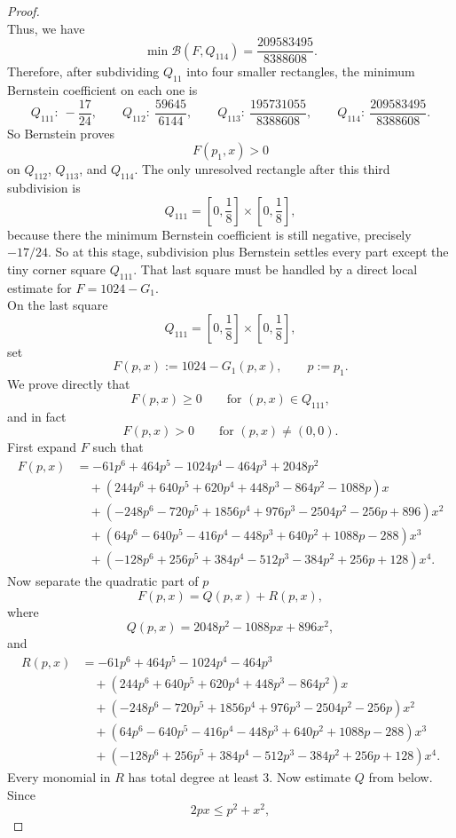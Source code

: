 \documentclass[a4paper,12pt,reqno]{amsart} %
\numberwithin{equation}{section}
\theoremstyle{definition}
\begin{document}
\begin{proof}
\[\]
Thus, we have
\[
\min \mathcal B(F,Q_{114})=\frac{209583495}{8388608}.
\]
Therefore, after subdividing \(Q_{11}\) into four smaller rectangles, the minimum Bernstein coefficient on each one is
\[
Q_{111}:\ -\frac{17}{24},\qquad
Q_{112}:\ \frac{59645}{6144},\qquad
Q_{113}:\ \frac{195731055}{8388608},\qquad
Q_{114}:\ \frac{209583495}{8388608}.
\]
So Bernstein proves
\[
F(p_1,x)>0
\]
on \(Q_{112}\), \(Q_{113}\), and \(Q_{114}\).
The only unresolved rectangle after this third subdivision is
\[
Q_{111}=\left[0,\frac18\right]\times\left[0,\frac18\right],
\]
because there the minimum Bernstein coefficient is still negative, precisely
$
-{17}/{24}.
$
So at this stage, subdivision plus Bernstein settles every part except the tiny corner square \(Q_{111}\). That last square must be handled by a direct local estimate for \(F=1024-G_1\).\\[2mm]
On the last square
\[
Q_{111}=\left[0,\frac18\right]\times\left[0,\frac18\right],
\]
set
\[
F(p,x):=1024-G_1(p,x), \qquad p:=p_1.
\]
We prove directly that
\[
F(p,x)\ge 0 \qquad \text{for } (p,x)\in Q_{111},
\]
and in fact
\[
F(p,x)>0 \qquad \text{for } (p,x)\neq(0,0).
\]
First expand $F$ such that 
\[
\begin{aligned}
	F(p,x)
	&=-61p^6+464p^5-1024p^4-464p^3+2048p^2 \\
	&\quad+\left(244p^6+640p^5+620p^4+448p^3-864p^2-1088p\right)x \\
	&\quad+\left(-248p^6-720p^5+1856p^4+976p^3-2504p^2-256p+896\right)x^2 \\
	&\quad+\left(64p^6-640p^5-416p^4-448p^3+640p^2+1088p-288\right)x^3 \\
	&\quad+\left(-128p^6+256p^5+384p^4-512p^3-384p^2+256p+128\right)x^4.
\end{aligned}
\]
Now separate the quadratic part of $p$
\[
F(p,x)=Q(p,x)+R(p,x),
\]
where
\[
Q(p,x)=2048p^2-1088px+896x^2,
\]
and
\[
\begin{aligned}
	R(p,x)
	&=-61p^6+464p^5-1024p^4-464p^3 \\
	&\quad+\left(244p^6+640p^5+620p^4+448p^3-864p^2\right)x \\
	&\quad+\left(-248p^6-720p^5+1856p^4+976p^3-2504p^2-256p\right)x^2 \\
	&\quad+\left(64p^6-640p^5-416p^4-448p^3+640p^2+1088p-288\right)x^3 \\
	&\quad+\left(-128p^6+256p^5+384p^4-512p^3-384p^2+256p+128\right)x^4.
\end{aligned}
\]
Every monomial in \(R\) has total degree at least \(3\).
Now estimate \(Q\) from below. Since
\[
2px\le p^2+x^2,
\]
\end{proof}
\end{document}
